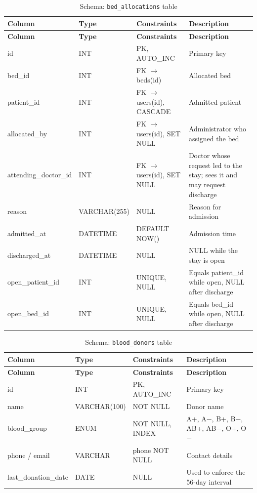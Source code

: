 \begin{longtable}{|L{3.3cm}|L{2.5cm}|L{2.4cm}|L{4.6cm}|}
\caption{Schema: \texttt{bed\_allocations} table} \label{tab:allocs} \\
\hline
\textbf{Column} & \textbf{Type} & \textbf{Constraints} & \textbf{Description} \\
\hline
\endfirsthead
\hline
\textbf{Column} & \textbf{Type} & \textbf{Constraints} & \textbf{Description} \\
\hline
\endhead
\hline
\endfoot
id & INT & PK, AUTO\_INC & Primary key \\
\hline
bed\_id & INT & FK $\rightarrow$ beds(id) & Allocated bed \\
\hline
patient\_id & INT & FK $\rightarrow$ users(id), CASCADE & Admitted patient \\
\hline
allocated\_by & INT & FK $\rightarrow$ users(id), SET NULL & Administrator who assigned the bed \\
\hline
attending\_doctor\_id & INT & FK $\rightarrow$ users(id), SET NULL & Doctor whose request led to the stay; sees it and may request discharge \\
\hline
reason & VARCHAR(255) & NULL & Reason for admission \\
\hline
admitted\_at & DATETIME & DEFAULT NOW() & Admission time \\
\hline
discharged\_at & DATETIME & NULL & NULL while the stay is open \\
\hline
open\_patient\_id & INT & UNIQUE, NULL & Equals patient\_id while open, NULL after discharge \\
\hline
open\_bed\_id & INT & UNIQUE, NULL & Equals bed\_id while open, NULL after discharge \\
\hline
\end{longtable}
\begin{longtable}{|L{3.3cm}|L{2.5cm}|L{2.4cm}|L{4.6cm}|}
\caption{Schema: \texttt{blood\_donors} table} \label{tab:donors} \\
\hline
\textbf{Column} & \textbf{Type} & \textbf{Constraints} & \textbf{Description} \\
\hline
\endfirsthead
\hline
\textbf{Column} & \textbf{Type} & \textbf{Constraints} & \textbf{Description} \\
\hline
\endhead
\hline
\endfoot
id & INT & PK, AUTO\_INC & Primary key \\
\hline
name & VARCHAR(100) & NOT NULL & Donor name \\
\hline
blood\_group & ENUM & NOT NULL, INDEX & A+, A$-$, B+, B$-$, AB+, AB$-$, O+, O$-$ \\
\hline
phone / email & VARCHAR & phone NOT NULL & Contact details \\
\hline
last\_donation\_date & DATE & NULL & Used to enforce the 56-day interval \\
\hline
\end{longtable}
